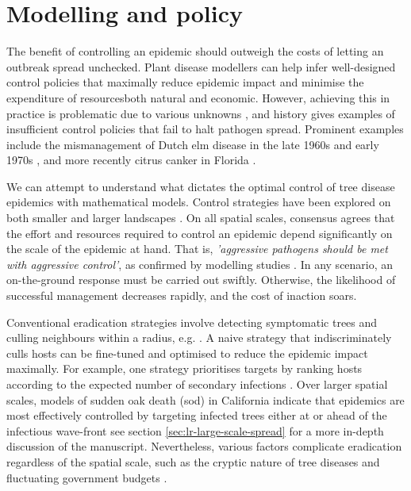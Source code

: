 \section{Modelling and policy}
\label{sec:modelling-and-policy}

The benefit of controlling an epidemic should outweigh the costs of letting an outbreak spread unchecked. 
Plant disease modellers can help infer well-designed control policies that maximally reduce epidemic impact and minimise the expenditure
of resources\textemdash both natural and economic. However, achieving this in practice is problematic due to various unknowns \cite{13-challenges}, and history gives examples of insufficient control policies that fail to halt pathogen spread. 
Prominent examples include the mismanagement of Dutch elm disease in the late 1960s and early 1970s \cite{dutch-elm-mismanage}, and more recently citrus canker in Florida \cite{schubert2001meeting}.

We can attempt to understand what dictates the optimal control of tree disease epidemics with mathematical models. 
Control strategies have been explored on both smaller \cite{risk-potential-control} and larger landscapes \cite{large-scale-control2}. 
On all spatial scales, consensus agrees that the effort and resources required to control an epidemic depend significantly on the scale of the epidemic at hand. That is, \textit{'aggressive pathogens should be met with aggressive control'}, as confirmed by modelling studies \cite{control-scale-matching, WEBIDEMICS}. 
In any scenario, an on-the-ground response must be carried out swiftly. Otherwise, the likelihood of successful management decreases rapidly, and the cost of inaction  soars.

Conventional eradication strategies involve detecting symptomatic trees and culling neighbours within a radius, e.g. \cite{WEBIDEMICS}.
A naive strategy that indiscriminately culls hosts can be fine-tuned and optimised to reduce the epidemic impact maximally. 
For example, one strategy prioritises targets by ranking hosts according to the expected number of secondary infections \cite{risk-potential-control}.
Over larger spatial scales, models of sudden oak death (\acrshort{sod}) in California indicate that epidemics are most effectively controlled by targeting infected trees either at or ahead of the infectious wave-front \cite{large-scale-control}\textemdash see section \ref{sec:lr-large-scale-spread} for a more in-depth discussion of the manuscript.
Nevertheless, various factors complicate eradication regardless of the spatial scale, such as the cryptic nature of tree diseases and fluctuating government budgets \cite{control-theory, control-theory-application}.

